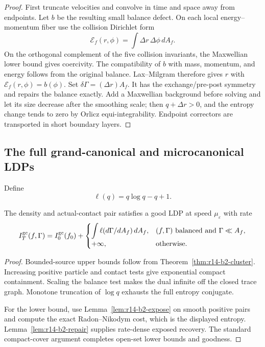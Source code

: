 \begin{proof}
First truncate velocities and convolve in time and space away from endpoints.
Let \(b\) be the resulting small balance defect.  On each local
energy--momentum fiber use the collision Dirichlet form
\[
 \mathcal E_f(r,\phi)=\int\Delta r\,\Delta\phi\,dA_f .
\]
On the orthogonal complement of the five collision invariants, the
Maxwellian lower bound gives coercivity.  The compatibility of \(b\) with
mass, momentum, and energy follows from the original balance.  Lax--Milgram
therefore gives \(r\) with
\(\mathcal E_f(r,\phi)=b(\phi)\).  Set
\(\delta\Gamma=(\Delta r)A_f\).  It has the exchange/pre-post symmetry and
repairs the balance exactly.  Add a Maxwellian background before solving and
let its size decrease after the smoothing scale; then
\(q+\Delta r>0\), and the entropy change tends to zero by Orlicz
equi-integrability.  Endpoint correctors are transported in short boundary
layers.
\end{proof}

\subsection{The full grand-canonical and microcanonical LDPs}

Define
\[
 \ell(q)=q\log q-q+1.
\]

\begin{theorem}
\label{thm:r14-b2-gcldp}
The density and actual-contact pair satisfies a good LDP at speed
\(\mu_\varepsilon\) with rate
\[
 I_T^{\rm gc}(f,\Gamma)
 =
 I_0^{\rm gc}(f_0)
 +\begin{cases}
 \displaystyle\int\ell(d\Gamma/dA_f)\,dA_f,
 &(f,\Gamma)\text{ balanced and }\Gamma\ll A_f,\\
 +\infty,&\text{otherwise}.
 \end{cases}
\]
\end{theorem}

\begin{proof}
Bounded-source upper bounds follow from
Theorem~\ref{thm:r14-b2-cluster}.  Increasing positive particle and contact
tests give exponential compact containment.  Scaling the balance test makes
the dual infinite off the closed trace graph.  Monotone truncation of
\(\log q\) exhausts the full entropy conjugate.

For the lower bound, use Lemma~\ref{lem:r14-b2-expose} on smooth positive
pairs and compute the exact Radon--Nikodym cost, which is the displayed
entropy.  Lemma~\ref{lem:r14-b2-repair} supplies rate-dense exposed recovery.
The standard compact-cover argument completes open-set lower bounds and
goodness.
\end{proof}

